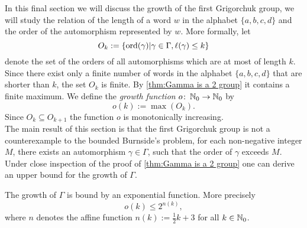 In this final section we will discuss the growth of the first Grigorchuk group, \ie we will study the relation of the length of a word $w$ in the alphabet $\lbrace a,b,c,d\rbrace$ and the order of the automorphism represented by $w$. More formally, let
\begin{equation*}
O_k:=\lbrace \operatorname{\mathrm{ord}}(\gamma)\vert\gamma\in\Gamma,\ell(\gamma)\leq k\rbrace
\end{equation*}
denote the set of the orders of all automorphisms which are at most of length $k$. Since there exist only a finite number of  words in the alphabet $\lbrace a,b,c,d\rbrace$ that are shorter than $k$, the set $O_k$ is finite. By \cref{thm:Gamma is a 2 group} it contains a  finite maximum.  We define the \emph{growth function} $o\colon \operatorname{\mathbb{N}}_0\to\operatorname{\mathbb{N}}_0$ by 
\begin{equation*}
o(k):=\max(O_k).
\end{equation*}
Since $O_k\subseteq O_{k+1}$ the function $o$ is monotonically increasing.\\
The main result of this section is that the first Grigorchuk group is not a counterexample to the bounded Burnside's problem, \ie for each non-negative integer $M$, there exists an automorphism $\gamma\in\Gamma$, such that the order of $\gamma$ exceeds $M$.\\
Under close inspection of the proof of \cref{thm:Gamma is a 2 group} one can derive an upper bound for the growth of $\Gamma$.
\begin{cor}\label{thm:Upper bound for the growth of Gamma}
The growth of $\Gamma$ is bound by an exponential function. More precisely
\begin{equation}\label{eq:Upper bound for the growth of Gamma}
o(k)\leq 2^{n(k)},
\end{equation}
where $n$ denotes the affine function $n(k):=\frac{1}{2}k+3$ for all $k\in\operatorname{\mathbb{N}}_0$.
\end{cor}

